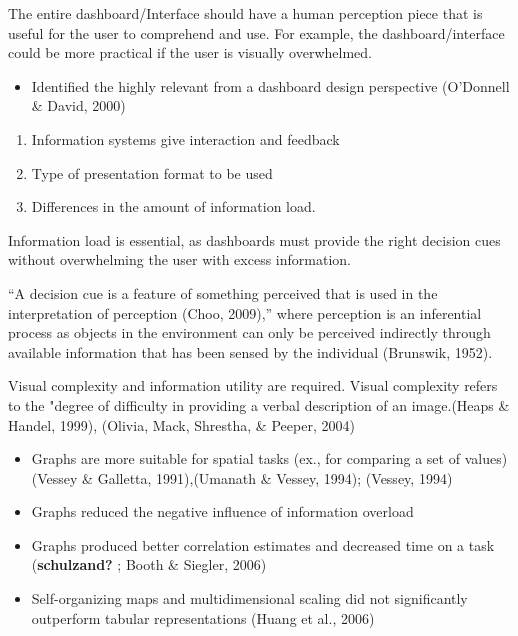 \documentclass[print]{nuthesis}
\providecommand{\tightlist}{%
  \setlength{\itemsep}{0pt}\setlength{\parskip}{0pt}}
\begin{document}
The entire dashboard/Interface should have a human perception piece that is useful for the user to comprehend and use. For example, the dashboard/interface could be more practical if the user is visually overwhelmed.

\begin{itemize}
\tightlist
\item
  Identified the highly relevant from a dashboard design perspective (O'Donnell \& David, 2000)
\end{itemize}

\begin{enumerate}
\def\labelenumi{\arabic{enumi}.}
\tightlist
\item
  Information systems give interaction and feedback
\item
  Type of presentation format to be used
\item
  Differences in the amount of information load.
\end{enumerate}

Information load is essential, as dashboards must provide the right decision cues without overwhelming the user with excess information.

``A decision cue is a feature of something perceived that is used in the interpretation of perception (Choo, 2009),'' where perception is an inferential process as objects in the environment can only be perceived indirectly through available information that has been sensed by the individual (Brunswik, 1952).

Visual complexity and information utility are required. Visual complexity refers to the "degree of difficulty in providing a verbal description of an image.(Heaps \& Handel, 1999), (Olivia, Mack, Shrestha, \& Peeper, 2004)

\begin{itemize}
\tightlist
\item
  Graphs are more suitable for spatial tasks (ex., for comparing a set of values) (Vessey \& Galletta, 1991),(Umanath \& Vessey, 1994); (Vessey, 1994)
\item
  Graphs reduced the negative influence of information overload
\item
  Graphs produced better correlation estimates and decreased time on a task (\textbf{schulzand?} ; Booth \& Siegler, 2006)
\item
  Self-organizing maps and multidimensional scaling did not significantly outperform tabular representations (Huang et al., 2006)
\end{itemize}
\end{document}
